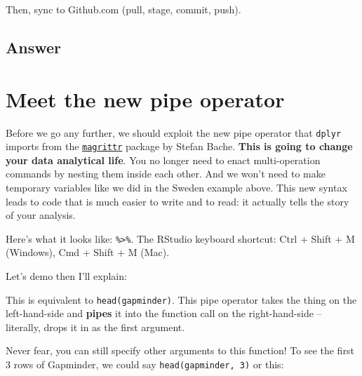 \documentclass[]{book}
\newenvironment{Shaded}{\begin{snugshade}}{\end{snugshade}}
\newcommand{\KeywordTok}[1]{\textcolor[rgb]{0.13,0.29,0.53}{\textbf{{#1}}}}
\newcommand{\StringTok}[1]{\textcolor[rgb]{0.31,0.60,0.02}{{#1}}}
\newcommand{\NormalTok}[1]{{#1}}
\theoremstyle{definition}
\theoremstyle{definition}
\theoremstyle{definition}
\theoremstyle{remark}
\begin{document}
Then, sync to Github.com (pull, stage, commit, push).

\subsection{Answer}\label{answer}

\begin{Shaded}
\end{Shaded}

\section{Meet the new pipe operator}\label{meet-the-new-pipe-operator}

Before we go any further, we should exploit the new pipe operator that
\texttt{dplyr} imports from the
\href{https://github.com/smbache/magrittr}{\texttt{magrittr}} package by
Stefan Bache. \textbf{This is going to change your data analytical
life}. You no longer need to enact multi-operation commands by nesting
them inside each other. And we won't need to make temporary variables
like we did in the Sweden example above. This new syntax leads to code
that is much easier to write and to read: it actually tells the story of
your analysis.

Here's what it looks like: \texttt{\%\textgreater{}\%}. The RStudio
keyboard shortcut: Ctrl + Shift + M (Windows), Cmd + Shift + M (Mac).

Let's demo then I'll explain:

\begin{Shaded}
\end{Shaded}

This is equivalent to \texttt{head(gapminder)}. This pipe operator takes
the thing on the left-hand-side and \textbf{pipes} it into the function
call on the right-hand-side -- literally, drops it in as the first
argument.

Never fear, you can still specify other arguments to this function! To
see the first 3 rows of Gapminder, we could say
\texttt{head(gapminder,\ 3)} or this:
\end{document}
